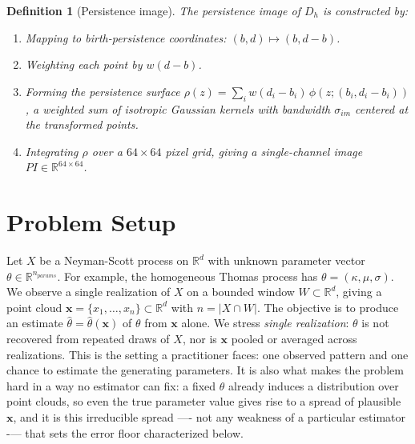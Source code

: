 \documentclass[11pt,letterpaper]{article}
\newcommand{\R}{\mathbb{R}}
\newcommand{\1}{\mathds{1}}
\newcommand{\pc}{\mathbf{x}}
\theoremstyle{plain}
\theoremstyle{definitioncolon}
\newtheorem{definition}[theorem]{Definition}
\begin{document}
    \begin{definition}[Persistence image]
    \label{def:per_image}
        The persistence image of $D_h$ is constructed by:
            \begin{enumerate}
                \item Mapping to birth-persistence coordinates:
                      $(b,d) \mapsto (b, d-b)$.
                \item Weighting each point by $w(d-b)$.
                \item Forming the persistence surface
                      $\rho(z) = \sum_i w(d_i - b_i)\,
                      \phi(z; (b_i, d_i - b_i))$, a weighted sum of isotropic
                      Gaussian kernels with bandwidth $\sigma_{im}$ centered at
                      the transformed points.
                \item Integrating $\rho$ over a $64 \times 64$ pixel grid,
                      giving a single-channel image $PI \in \R^{64 \times 64}$.
            \end{enumerate}
    \end{definition}



\section{Problem Setup}
\label{sec:problem}

Let $X$ be a Neyman-Scott process on $\R^d$ with unknown parameter vector
$\theta \in \R^{n_{params}}$. For example, the homogeneous Thomas process has 
$\theta = (\kappa, \mu, \sigma)$. We observe a single realization of $X$ on a 
bounded window $W \subset \R^d$, giving a point cloud
$\pc = \{x_1, \dots, x_n\} \subset \R^d$ with $n = |X \cap W|$. The objective is to 
produce an estimate $\hat\theta = \hat\theta(\pc)$ of $\theta$ from $\pc$ alone.
We stress \emph{single realization}: $\theta$ is not recovered from repeated draws of $X$, nor 
is $\pc$ pooled or averaged across realizations. This is the setting a practitioner
faces: one observed pattern and one chance to estimate the generating parameters.
It is also what makes the problem hard in a way no estimator can fix: a 
fixed $\theta$ already induces a distribution over point clouds, so even the true 
parameter value gives rise to a spread of plausible $\pc$, and it is this irreducible 
spread —- not any weakness of a particular estimator -— that sets the error floor 
characterized below.
\end{document}
